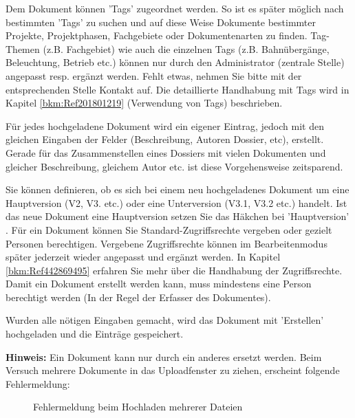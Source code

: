 Dem Dokument können 'Tags'  zugeordnet werden. So ist es später möglich nach bestimmten 'Tags' zu suchen und auf diese Weise Dokumente bestimmter Projekte, Projektphasen, Fachgebiete oder Dokumentenarten zu finden. Tag-Themen (z.B. Fachgebiet) wie auch die einzelnen Tags (z.B. Bahnübergänge, Beleuchtung, Betrieb etc.) können nur durch den Administrator (zentrale Stelle) angepasst resp. ergänzt werden. Fehlt etwas, nehmen Sie bitte mit der entsprechenden Stelle Kontakt auf. Die detaillierte Handhabung mit Tags wird in Kapitel \ref{bkm:Ref201801219} (Verwendung von Tags) beschrieben. \newline

Für jedes hochgeladene Dokument wird ein eigener Eintrag, jedoch mit den gleichen Eingaben der Felder (Beschreibung, Autoren Dossier, etc), erstellt. Gerade für das Zusammenstellen eines Dossiers mit vielen Dokumenten und gleicher Beschreibung, gleichem Autor etc. ist diese Vorgehensweise zeitsparend. 


Sie können definieren, ob es sich bei einem neu hochgeladenes Dokument um eine Hauptversion (V2, V3. etc.) oder eine Unterversion (V3.1, V3.2 etc.) handelt. Ist das neue Dokument eine Hauptversion setzen Sie das Häkchen bei 'Hauptversion' . Für ein Dokument können Sie Standard-Zugriffsrechte vergeben  oder gezielt Personen berechtigen. Vergebene Zugriffsrechte können im Bearbeitenmodus später jederzeit wieder angepasst und ergänzt werden. In Kapitel \ref{bkm:Ref442869495} erfahren Sie mehr über die Handhabung der Zugriffsrechte. Damit ein Dokument erstellt werden kann, muss mindestens eine Person berechtigt werden (In der Regel der Erfasser des Dokumentes).

Wurden alle nötigen Eingaben gemacht, wird das Dokument mit 'Erstellen'  hochgeladen und die Einträge gespeichert. \newline

\textbf{Hinweis:} Ein Dokument kann nur durch ein anderes ersetzt werden. Beim Versuch mehrere Dokumente in das Uploadfenster zu ziehen, erscheint folgende Fehlermeldung:

\begin{figure}[H]
\caption{Fehlermeldung beim Hochladen mehrerer Dateien}
\end{figure}

